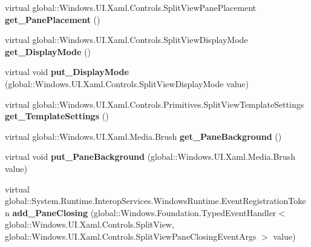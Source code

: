 \begin{DoxyCompactItemize}
virtual global\+::\+Windows.\+U\+I.\+Xaml.\+Controls.\+Split\+View\+Pane\+Placement {\bfseries get\+\_\+\+Pane\+Placement} ()
\item 
\mbox{\label{class_windows_1_1_u_i_1_1_xaml_1_1_controls_1_1_split_view_af29bc8fd9090a72aea2eaf4b3f2c0a30}} 
virtual global\+::\+Windows.\+U\+I.\+Xaml.\+Controls.\+Split\+View\+Display\+Mode {\bfseries get\+\_\+\+Display\+Mode} ()
\item 
\mbox{\label{class_windows_1_1_u_i_1_1_xaml_1_1_controls_1_1_split_view_a1b48b7569672c2b406106e1b2c94556b}} 
virtual void {\bfseries put\+\_\+\+Display\+Mode} (global\+::\+Windows.\+U\+I.\+Xaml.\+Controls.\+Split\+View\+Display\+Mode value)
\item 
\mbox{\label{class_windows_1_1_u_i_1_1_xaml_1_1_controls_1_1_split_view_add67530a837afbb62bb137f7cc503647}} 
virtual global\+::\+Windows.\+U\+I.\+Xaml.\+Controls.\+Primitives.\+Split\+View\+Template\+Settings {\bfseries get\+\_\+\+Template\+Settings} ()
\item 
\mbox{\label{class_windows_1_1_u_i_1_1_xaml_1_1_controls_1_1_split_view_a47635cfeb856accea21323a3ca5eb9da}} 
virtual global\+::\+Windows.\+U\+I.\+Xaml.\+Media.\+Brush {\bfseries get\+\_\+\+Pane\+Background} ()
\item 
\mbox{\label{class_windows_1_1_u_i_1_1_xaml_1_1_controls_1_1_split_view_a6096724a8ab2470ff7286a1cb40cb0f3}} 
virtual void {\bfseries put\+\_\+\+Pane\+Background} (global\+::\+Windows.\+U\+I.\+Xaml.\+Media.\+Brush value)
\item 
\mbox{\label{class_windows_1_1_u_i_1_1_xaml_1_1_controls_1_1_split_view_a1f06fc0c80e7b9e8814204845dac854c}} 
virtual global\+::\+System.\+Runtime.\+Interop\+Services.\+Windows\+Runtime.\+Event\+Registration\+Token {\bfseries add\+\_\+\+Pane\+Closing} (global\+::\+Windows.\+Foundation.\+Typed\+Event\+Handler$<$ global\+::\+Windows.\+U\+I.\+Xaml.\+Controls.\+Split\+View, global\+::\+Windows.\+U\+I.\+Xaml.\+Controls.\+Split\+View\+Pane\+Closing\+Event\+Args $>$ value)

\end{DoxyCompactItemize}
